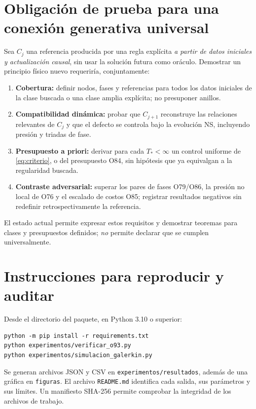 \documentclass[11pt,a4paper]{article}
\theoremstyle{definition}\newtheorem{defi}[teo]{Definición}
\begin{document}
\section{Obligación de prueba para una conexión generativa universal}
Sea $C_j$ una referencia producida por una regla explícita \emph{a partir de datos iniciales y actualización causal}, sin usar la solución futura como oráculo. Demostrar un principio físico nuevo requeriría, conjuntamente:
\begin{enumerate}
\item \textbf{Cobertura:} definir nodos, fases y referencias para todos los datos iniciales de la clase buscada o una clase amplia explícita; no presuponer anillos.
\item \textbf{Compatibilidad dinámica:} probar que $C_{j+1}$ reconstruye las relaciones relevantes de $C_j$ y que el defecto se controla bajo la evolución NS, incluyendo presión y triadas de fase.
\item \textbf{Presupuesto a priori:} derivar para cada $T_*<\infty$ un control uniforme de \eqref{eq:criterio}, o del presupuesto O84, sin hipótesis que ya equivalgan a la regularidad buscada.
\item \textbf{Contraste adversarial:} superar los pares de fases O79/O86, la presión no local de O76 y el escalado de costos O85; registrar resultados negativos sin redefinir retrospectivamente la referencia.
\end{enumerate}
El estado actual permite expresar estos requisitos y demostrar teoremas para clases y presupuestos definidos; \emph{no} permite declarar que se cumplen universalmente.

\section{Instrucciones para reproducir y auditar}
Desde el directorio del paquete, en Python 3.10 o superior:
\begin{verbatim}
python -m pip install -r requirements.txt
python experimentos/verificar_o93.py
python experimentos/simulacion_galerkin.py
\end{verbatim}
Se generan archivos JSON y CSV en \texttt{experimentos/resultados}, además de una gráfica en \texttt{figuras}. El archivo \texttt{README.md} identifica cada salida, sus parámetros y sus límites. Un manifiesto SHA-256 permite comprobar la integridad de los archivos de trabajo.
\end{document}
